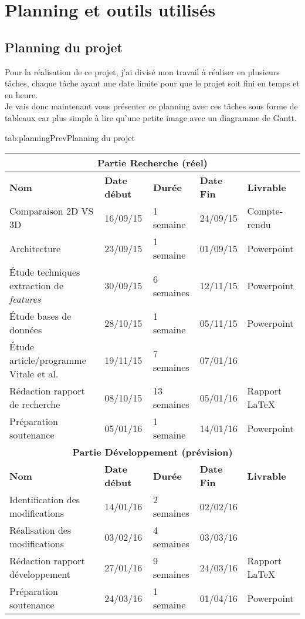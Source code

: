 \documentclass[poster]{polytech/polytech}
\begin{document}
\chapter{Planning et outils utilisés}
\label{chap:chap_planning}

\section{Planning du projet}
\label{sec:planning}
Pour la réalisation de ce projet, j'ai divisé mon travail à réaliser en plusieurs tâches, chaque tâche ayant une date limite pour que le projet soit fini en temps et en heure.\\
Je vais donc maintenant vous présenter ce planning avec ces tâches sous forme de tableaux car plus simple à lire qu'une petite image avec un diagramme de Gantt.

\begin{Table}{tab:planningPrev}{Planning du projet}
	\begin{tabular}{|p{5cm}|p{2cm}|p{2cm}|p{2cm}|p{2cm}|}
		\hline
		\multicolumn{5}{|c|}{\textbf{Partie Recherche (réel)}}\\\hline
		\textbf{Nom} &\textbf{Date début} &\textbf{Durée} &\textbf{Date Fin} &\textbf{Livrable}\\\hline
		Comparaison 2D VS 3D &16/09/15 &1 semaine &24/09/15 & Compte-rendu\\\hline
		Architecture &23/09/15 &1 semaine &01/09/15 & Powerpoint\\\hline
		Étude techniques extraction de \textit{features} &30/09/15 &6 semaines &12/11/15 & Powerpoint\\\hline
		Étude bases de données &28/10/15 &1 semaine &05/11/15 & Powerpoint\\\hline
		Étude article/programme Vitale et al. &19/11/15 &7 semaines &07/01/16 & \\\hline
		Rédaction rapport de recherche &08/10/15 &13 semaines &05/01/16 & Rapport \LaTeX\\\hline
		Préparation soutenance &05/01/16 &1 semaine &14/01/16 & Powerpoint\\\hline
		\hline
		\multicolumn{5}{|c|}{\textbf{Partie Développement (prévision)}}\\\hline
		\textbf{Nom} &\textbf{Date début} &\textbf{Durée} &\textbf{Date Fin} &\textbf{Livrable}\\\hline
		Identification des modifications &14/01/16 &2 semaines &02/02/16 & \\\hline
		Réalisation des modifications &03/02/16 &4 semaines &03/03/16 & \\\hline
		Rédaction rapport développement &27/01/16 &9 semaines &24/03/16 & Rapport \LaTeX\\\hline
		Préparation soutenance &24/03/16 &1 semaine &01/04/16 & Powerpoint\\\hline
	\end{tabular}
\end{Table}
\end{document}
